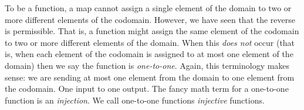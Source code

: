 \documentclass[10pt,]{book}
\theoremstyle{plain}
\theoremstyle{definition}
\theoremstyle{definition}
\theoremstyle{definition}
\begin{document}
      To be a function, a map cannot assign a single element of the domain to two or more different elements of the codomain. However, we have seen that the reverse is permissible. That is, a function might assign the same element of the codomain to two or more different elements of the domain. When this \emph{does not} occur (that is, when each element of the codomain is assigned to at most one element of the domain) then we say the function is \emph{one-to-one}. Again, this terminology makes sense: we are sending at most one element from the domain to one element from the codomain. One input to one output. The fancy math term for a one-to-one function is an \emph{injection}. We call one-to-one functions \emph{injective} functions.
\par
\end{document}
